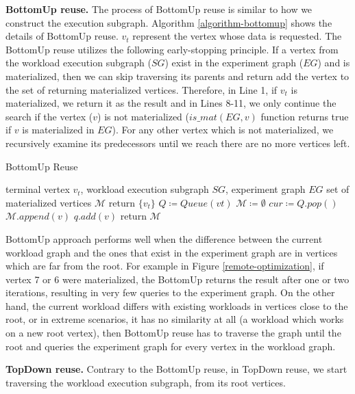 {\textbf{BottomUp reuse.}
The process of BottomUp reuse is similar to how we construct the execution subgraph.
Algorithm \ref{algorithm-bottomup} shows the details of BottomUp reuse.
$v_t$ represent the vertex whose data is requested.
The BottomUp reuse utilizes the following early-stopping principle. 
If a vertex from the workload execution subgraph ($SG$) exist in the experiment graph ($EG$) and is materialized, then we can skip traversing its parents and return add the vertex to the set of returning materialized vertices.
Therefore, in Line 1, if $v_t$ is materialized, we return it as the result and in Lines 8-11, we only continue the search if the vertex ($v$) is not materialized ($is\_mat(EG, v)$ function returns true if $v$ is materialized in $EG$).
For any other vertex which is not materialized, we recursively examine its predecessors until we reach there are no more vertices left.

\begin{algorithm}[h]
\caption{BottomUp Reuse}\label{algorithm-bottomup}
\begin{algorithmic}[1]
\Require terminal vertex $v_t$, workload execution subgraph  $SG$, experiment graph $EG$ 
\Ensure set of materialized vertices $\mathcal{M}$ 
	\State return $\{v_t\}$
\EndIf
\State $Q \coloneqq  Queue(vt)$  
\State $\mathcal{M} \coloneqq \emptyset$
	\State $cur  \coloneqq  Q.pop()$
			\State	$\mathcal{M}.append(v)$
		\Else
			\State $q.add(v)$
		\EndIf
	\EndFor
\EndWhile
\State return $\mathcal{M}$
\end{algorithmic}
\end{algorithm}
BottomUp approach performs well when the difference between the current workload graph and the ones that exist in the experiment graph are in vertices which are far from the root.
For example in Figure \ref{remote-optimization}, if vertex 7 or 6 were materialized, the BottomUp returns the result after one or two iterations, resulting in very few queries to the experiment graph.
On the other hand, the current workload differs with existing workloads in vertices close to the root, or in extreme scenarios, it has no similarity at all (a workload which works on a new root vertex), then BottomUp reuse has to traverse the graph until the root and queries the experiment graph for every vertex in the workload graph.

\textbf{TopDown reuse.}
Contrary to the BottomUp reuse, in TopDown reuse, we start traversing the workload execution subgraph, from its root vertices.

}
